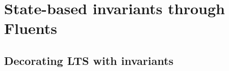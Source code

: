 \section{State-based invariants through Fluents\label{section:background-fluents}}

\subsection{Decorating LTS with invariants}


